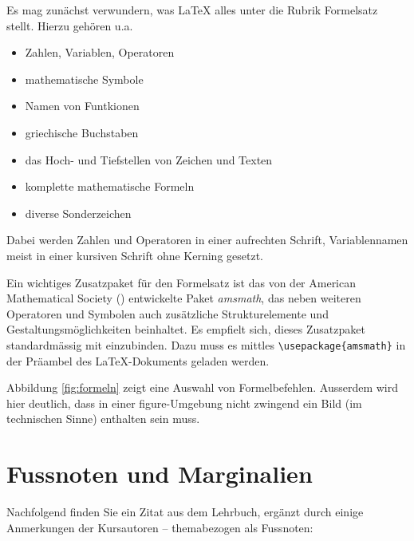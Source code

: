 \documentclass[11pt, a4paper,draft]{article}
\newcommand{\ltx}{\LaTeX}
\let\oldmarginpar\marginpar
\renewcommand{\marginpar}[1]{\oldmarginpar{\textit{#1}}}
\begin{document}
Es mag zunächst verwundern, was \ltx{} alles unter die Rubrik Formelsatz stellt. Hierzu gehören u.a.
\begin{itemize}
\item Zahlen, Variablen, Operatoren
\item mathematische Symbole
\item Namen von Funtkionen
\item griechische Buchstaben
\item das Hoch- und Tiefstellen von Zeichen und Texten
\item komplette mathematische Formeln
\item diverse Sonderzeichen
\end{itemize}

Dabei werden Zahlen und Operatoren in einer aufrechten Schrift, Variablennamen meist in einer kursiven Schrift ohne Kerning gesetzt.

Ein wichtiges Zusatzpaket für den Formelsatz ist das von der American Mathematical Society (\AmS) entwickelte Paket \textit{amsmath}, das neben weiteren Operatoren und Symbolen auch zusätzliche Strukturelemente und Gestaltungsmöglichkeiten beinhaltet. Es empfielt sich, dieses Zusatzpaket standardmässig mit einzubinden. Dazu muss es mittles \verb+\usepackage{amsmath}+ in der Präambel des \ltx-Dokuments geladen werden.

Abbildung \ref{fig:formeln} zeigt eine Auswahl von Formelbefehlen. Ausserdem wird hier deutlich, dass in einer figure-Umgebung nicht zwingend ein Bild (im technischen Sinne) enthalten sein muss.

\clearpage %

\section{Fussnoten und Marginalien}

Nachfolgend finden Sie ein Zitat aus dem Lehrbuch, ergänzt durch einige Anmerkungen der Kursautoren -- themabezogen als Fussnoten\marginpar{Fussnoten}:
\end{document}
